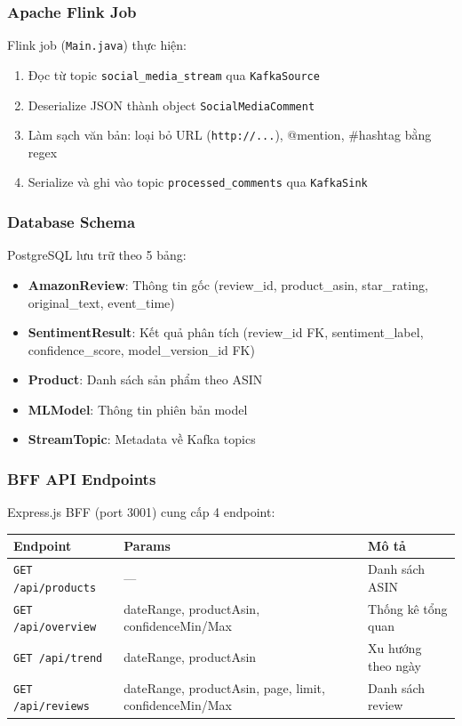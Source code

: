 \subsubsection{Apache Flink Job}

Flink job (\texttt{Main.java}) thực hiện:
\begin{enumerate}
    \item Đọc từ topic \texttt{social\_media\_stream} qua \texttt{KafkaSource}
    \item Deserialize JSON thành object \texttt{SocialMediaComment}
    \item Làm sạch văn bản: loại bỏ URL (\texttt{http://...}), @mention, \#hashtag bằng regex
    \item Serialize và ghi vào topic \texttt{processed\_comments} qua \texttt{KafkaSink}
\end{enumerate}

\subsubsection{Database Schema}

PostgreSQL lưu trữ theo 5 bảng:
\begin{itemize}
    \item \textbf{AmazonReview}: Thông tin gốc (review\_id, product\_asin, star\_rating, original\_text, event\_time)
    \item \textbf{SentimentResult}: Kết quả phân tích (review\_id FK, sentiment\_label, confidence\_score, model\_version\_id FK)
    \item \textbf{Product}: Danh sách sản phẩm theo ASIN
    \item \textbf{MLModel}: Thông tin phiên bản model
    \item \textbf{StreamTopic}: Metadata về Kafka topics
\end{itemize}

\subsubsection{BFF API Endpoints}

Express.js BFF (port 3001) cung cấp 4 endpoint:

\begin{table}[h]
\centering
\begin{tabular}{|l|l|l|}
\hline
\textbf{Endpoint} & \textbf{Params} & \textbf{Mô tả} \\
\hline
\texttt{GET /api/products} & --- & Danh sách ASIN \\
\hline
\texttt{GET /api/overview} & dateRange, productAsin, confidenceMin/Max & Thống kê tổng quan \\
\hline
\texttt{GET /api/trend} & dateRange, productAsin & Xu hướng theo ngày \\
\hline
\texttt{GET /api/reviews} & dateRange, productAsin, page, limit, confidenceMin/Max & Danh sách review \\
\hline
\end{tabular}
\end{table}

